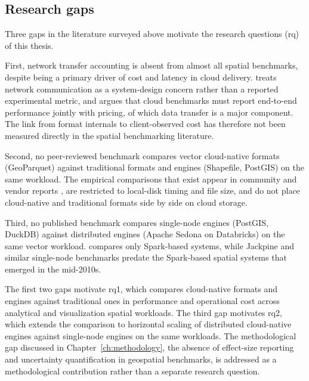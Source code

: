 \subsection{Research gaps}
\label{related-work:research-gaps}
Three gaps in the literature surveyed above motivate the research questions (\acrshort{rq}) of this thesis.

First, network transfer accounting is absent from almost all spatial benchmarks, despite being a primary driver of cost and latency in cloud delivery. \textcite{tang2020_locationspark_distributed_spatial_query} treats network communication as a system-design concern rather than a reported experimental metric, and \textcite{folkerts2012_benchmarking_in_the_cloud} argues that cloud benchmarks must report end-to-end performance jointly with pricing, of which data transfer is a major component. The link from format internals to client-observed cost has therefore not been measured directly in the spatial benchmarking literature.

Second, no peer-reviewed benchmark compares vector cloud-native formats (GeoParquet) against traditional formats and engines (Shapefile, PostGIS) on the same workload. The empirical comparisons that exist appear in community and vendor reports \parencite{holmes2023_geoparquet_performance, flatgeobuf2024_flatgeobuf_benchmarks}, are restricted to local-disk timing and file size, and do not place cloud-native and traditional formats side by side on cloud storage.

Third, no published benchmark compares single-node engines (PostGIS, DuckDB) against distributed engines (Apache Sedona on Databricks) on the same vector workload. \textcite{pandey2018_how_good_modern_spatial_analytics} compares only Spark-based systems, while Jackpine \parencite{ray2011_jackpine_spatial_database_benchmark} and similar single-node benchmarks predate the Spark-based spatial systems that emerged in the mid-2010s.

The first two gaps motivate \acrshort{rq}1, which compares cloud-native formats and engines against traditional ones in performance and operational cost across analytical and visualization spatial workloads. The third gap motivates \acrshort{rq}2, which extends the comparison to horizontal scaling of distributed cloud-native engines against single-node engines on the same workloads. The methodological gap discussed in Chapter~\ref{ch:methodology}, the absence of effect-size reporting and uncertainty quantification in geospatial benchmarks, is addressed as a methodological contribution rather than a separate research question.